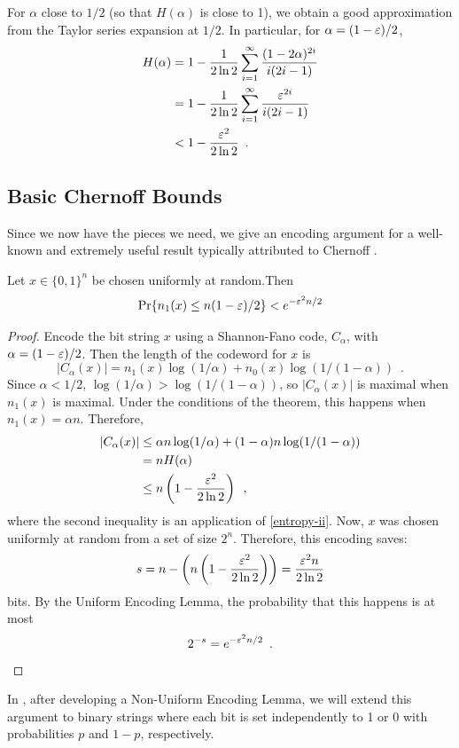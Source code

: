 \documentclass{patmorin}
\begin{document}
For $\alpha$ close to $1/2$ (so that $H(\alpha)$ is close to 1), we
obtain a good approximation from the Taylor series expansion at $1/2$. In
particular, for $\alpha=(1-\varepsilon)/2$,
\begin{align}
   H(\alpha) & = 1-\frac{1}{2\ln 2}\sum_{i=1}^{\infty}\frac{(1-2\alpha)^{2i}}{i(2i-1)} 
            \notag \\ 
        & = 1-\frac{1}{2\ln 2}\sum_{i=1}^{\infty}\frac{\eps^{2i}}{i(2i-1)} 
             \notag \\ 
        & < 1-\frac{\eps^2}{2\ln 2} \enspace .\eqlabel{entropy-ii}
\end{align}

\subsection{Basic Chernoff Bounds}

Since we now have the pieces we need, we give an encoding argument
for a well-known and extremely useful result typically attributed to
Chernoff \cite{X}.

\begin{thm}
  Let $x\in\{0,1\}^n$ be chosen uniformly at random.Then
  \[  \Pr\{n_1(x) \le n(1-\varepsilon)/2\} < e^{-\varepsilon^2n/2} \]
\end{thm}

\begin{proof}
  Encode the bit string $x$ using a Shannon-Fano code, $C_\alpha$,
  with $\alpha=(1-\varepsilon)/2$.  Then the length of the codeword for
  $x$ is
  \[
  |C_\alpha(x)| = n_1(x)\log(1/\alpha) + n_0(x)\log (1/(1-\alpha))
  \enspace .
  \]
  Since $\alpha < 1/2$, $\log(1/\alpha) > \log(1/(1-\alpha))$, so
  $|C_\alpha(x)|$ is maximal when $n_1(x)$ is maximal.  Under the
  conditions of the theorem, this happens when $n_1(x)=\alpha n$.
  Therefore,
  \begin{align*}
    |C_\alpha(x)| & \le \alpha n\log(1/\alpha) + (1-\alpha)n\log(1/(1-\alpha))\\
    & = n H(\alpha) \\
    & \le n\left(1-\frac{\varepsilon^2}{2\ln 2}\right) \enspace ,
  \end{align*}
  where the second inequality is an application of \eqref{entropy-ii}.
  Now, $x$ was chosen uniformly at random from a set of size $2^n$.
  Therefore, this encoding saves:
  \[  
  s = n-\left(n\left(1-\frac{\varepsilon^2}{2\ln 2}\right)\right) =
  \frac{\varepsilon^2n}{2\ln 2}
  \]
  bits.  By the Uniform Encoding Lemma, the probability that this
  happens is at most
  \[
  2^{-s} = e^{-\varepsilon^2n/2} \enspace . \qedhere
  \]
\end{proof}
In , after developing a Non-Uniform Encoding Lemma,
we will extend this argument to binary strings where each bit is set
independently to 1 or 0 with probabilities $p$ and $1-p$,
respectively.
\end{document}
